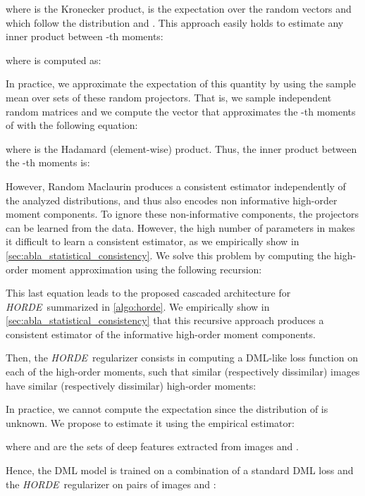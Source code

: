 \documentclass[10pt,twocolumn,letterpaper]{article}
\def\ourmethod{\textit{HORDE}}
\begin{document}
        where  is the Kronecker product,  is the expectation over the random vectors  and  which follow the distribution  and .
        This approach easily holds to estimate any inner product between -th moments:
        
        where  is computed as:
        
        In practice, we approximate the expectation of this quantity by using the sample mean over  sets of these random projectors.
        That is, we sample independent random matrices  and we compute the vector  that approximates the -th moments of  with the following equation:
        
        where  is the Hadamard (element-wise) product.
        Thus, the inner product between the -th moments is:
        
        
        However, Random Maclaurin produces a consistent estimator independently of the analyzed distributions, and thus also encodes non informative high-order moment components.
        To ignore these non-informative components, the projectors  can be learned from the data.
        However, the high number of parameters in  makes it difficult to learn a consistent estimator, as we empirically show in \autoref{sec:abla_statistical_consistency}.
        We solve this problem by computing the high-order moment approximation using the following recursion:
        
        This last equation leads to the proposed cascaded architecture for \ourmethod \ summarized in \autoref{algo:horde}.
We empirically show in \autoref{sec:abla_statistical_consistency} that this recursive approach produces a consistent estimator of the informative high-order moment components.
        
        Then, the \ourmethod \ regularizer consists in computing a DML-like loss function on each of the high-order moments, such that similar (respectively dissimilar) images have similar (respectively dissimilar) high-order moments:
                
        In practice, we cannot compute the expectation  since the distribution of  is unknown.
        We propose to estimate it using the empirical estimator:
        
        where  and  are the sets of deep features extracted from images  and .
        
        Hence, the DML model is trained on a combination of a standard DML loss and the \ourmethod \ regularizer on pairs of images  and :
        
\end{document}
